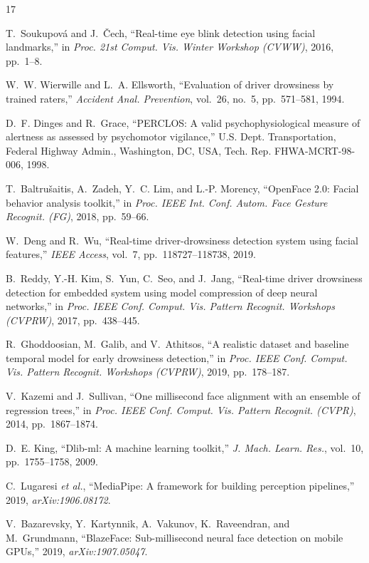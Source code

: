 \documentclass{IEEE_lsens}
\begin{document}
\begin{thebibliography}{17}

T.~Soukupov\'a and J.~\v{C}ech, ``Real-time eye blink detection using facial
landmarks,'' in \emph{Proc. 21st Comput. Vis. Winter Workshop (CVWW)}, 2016,
pp.~1--8.

W.~W. Wierwille and L.~A. Ellsworth, ``Evaluation of driver drowsiness by
trained raters,'' \emph{Accident Anal. Prevention}, vol.~26, no.~5,
pp.~571--581, 1994.

D.~F. Dinges and R.~Grace, ``PERCLOS: A valid psychophysiological measure of
alertness as assessed by psychomotor vigilance,'' U.S. Dept. Transportation,
Federal Highway Admin., Washington, DC, USA, Tech. Rep. FHWA-MCRT-98-006,
1998.

T.~Baltru\v{s}aitis, A.~Zadeh, Y.~C. Lim, and L.-P. Morency, ``OpenFace 2.0:
Facial behavior analysis toolkit,'' in \emph{Proc. IEEE Int. Conf. Autom.
Face Gesture Recognit. (FG)}, 2018, pp.~59--66.

W.~Deng and R.~Wu, ``Real-time driver-drowsiness detection system using facial
features,'' \emph{IEEE Access}, vol.~7, pp.~118727--118738, 2019.

B.~Reddy, Y.-H. Kim, S.~Yun, C.~Seo, and J.~Jang, ``Real-time driver
drowsiness detection for embedded system using model compression of deep
neural networks,'' in \emph{Proc. IEEE Conf. Comput. Vis. Pattern Recognit.
Workshops (CVPRW)}, 2017, pp.~438--445.

R.~Ghoddoosian, M.~Galib, and V.~Athitsos, ``A realistic dataset and baseline
temporal model for early drowsiness detection,'' in \emph{Proc. IEEE Conf.
Comput. Vis. Pattern Recognit. Workshops (CVPRW)}, 2019, pp.~178--187.

V.~Kazemi and J.~Sullivan, ``One millisecond face alignment with an ensemble
of regression trees,'' in \emph{Proc. IEEE Conf. Comput. Vis. Pattern
Recognit. (CVPR)}, 2014, pp.~1867--1874.

D.~E. King, ``Dlib-ml: A machine learning toolkit,'' \emph{J. Mach. Learn.
Res.}, vol.~10, pp.~1755--1758, 2009.

C.~Lugaresi \textit{et al.}, ``MediaPipe: A framework for building perception
pipelines,'' 2019, \emph{arXiv:1906.08172}.

V.~Bazarevsky, Y.~Kartynnik, A.~Vakunov, K.~Raveendran, and M.~Grundmann,
``BlazeFace: Sub-millisecond neural face detection on mobile GPUs,'' 2019,
\emph{arXiv:1907.05047}.


\end{thebibliography}
\end{document}
